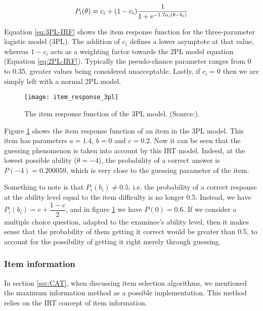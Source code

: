 \begin{equation} \label{eq:3PL-IRF}
P_i(\theta) = c_i + (1-c_i) \frac{1}{1 + \mathrm{e}^{-1.7a_i(\theta - b_i)}}
\end{equation}

Equation \eqref{eq:3PL-IRF} shows the item response function for the three-parameter logistic model (3PL). The addition of $c_i$ defines a lower asymptote at that value, whereas $1-c_i$ acts as a weighting factor towards the 2PL model equation (Equation \eqref{eq:2PL-IRF}). Typically the pseudo-chance parameter ranges from 0 to 0.35, greater values being considered unacceptable. Lastly, if $c_i=0$ then we are simply left with a normal 2PL model.

\begin{figure}[H]
\centering
\texttt{[image: item\_response\_3pl]}
\caption{The item response function of the 3PL model. (Source:\cite{Visual-IRT}).}
\label{fig:item_response_3pl}
\end{figure}

Figure \ref{fig:item_response_3pl} shows the item response function of an item in the 3PL model. This item has parameters $a=1.4$, $b=0$ and $c=0.2$. Now it can be seen that the guessing phenomenon is taken into account by this IRT model. Indeed, at the lowest possible ability ($\theta=-4$), the probability of a correct answer is $P(-4)=0.200059$, which is very close to the guessing parameter of the item.\newline

Something to note is that $P_i(b_i) \neq 0.5$, i.e. the probability of a correct response at the ability level equal to the item difficulty is no longer 0.5. Instead, we have $P_i(b_i)= c + \dfrac{1-c}{2}$, and in figure \ref{fig:item_response_3pl} we have $P(0)=0.6$. If we consider a multiple choice question, adapted to the examinee's ability level, then it makes sense that the probability of them getting it correct would be greater than 0.5, to account for the possibility of getting it right merely through guessing.

\subsubsection{Item information}
In section \ref{sec:CAT}, when discussing item selection algorithms, we mentioned the maximum information method as a possible implementation. This method relies on the IRT concept of item information.\newline

